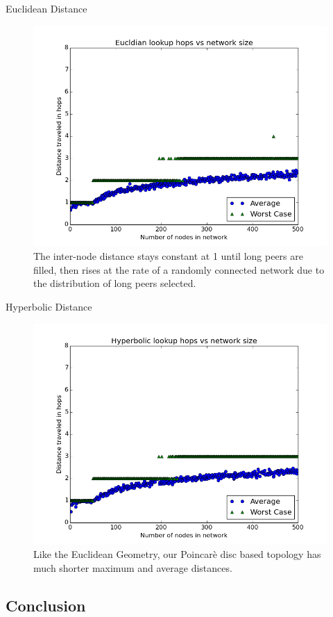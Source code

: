 \documentclass[11pt]{beamer}
\begin{document}
\begin{frame}{Euclidean Distance}
	\begin{figure}
		\centering
		\includegraphics[width=0.7\linewidth]{figs/EucldianDistance}
		\caption[Hops in Euclidean UrDHT]{The inter-node distance stays constant at 1 until long peers are filled, then rises at the rate of a randomly connected network due to the distribution of long peers selected.}
		\label{fig:EucldianDistance}
	\end{figure}
\end{frame}
	


\begin{frame}{Hyperbolic Distance}
	\begin{figure}
		\centering
		\includegraphics[width=0.7\linewidth]{figs/HyperbolicDistance}
		\caption[Hops in Hyperbolic UrDHT]{Like the Euclidean Geometry, our Poincar\`{e} disc based topology has much shorter maximum and average distances.
		}
		\label{fig:HyperbolicDistance}
	\end{figure}
\end{frame}
	



\subsection{Conclusion}
\end{document}
